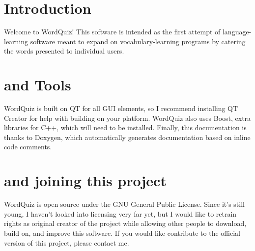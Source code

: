 \hypertarget{index_Introduction}{}\section{Introduction}\label{index_Introduction}
Welcome to WordQuiz! This software is intended as the first attempt of language-\/learning software meant to expand on vocabulary-\/learning programs by catering the words presented to individual users.\hypertarget{index_Organization}{}\section{and Tools}\label{index_Organization}
WordQuiz is built on QT for all GUI elements, so I recommend installing QT Creator for help with building on your platform. WordQuiz also uses Boost, extra libraries for C++, which will need to be installed. Finally, this documentation is thanks to Doxygen, which automatically generates documentation based on inline code comments.\hypertarget{index_Licensing}{}\section{and joining this project}\label{index_Licensing}
WordQuiz is open source under the GNU General Public License. Since it's still young, I haven't looked into licensing very far yet, but I would like to retrain rights as original creator of the project while allowing other people to download, build on, and improve this software. If you would like contribute to the official version of this project, please contact me. 